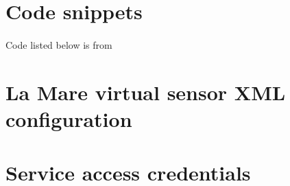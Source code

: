 \begin{appendices}
    \section{Code snippets}
    \label{appendix:fcode}
    \paragraph{}Code listed below is from \cite{pal}
    
    \clearpage
    \section{La Mare virtual sensor XML configuration}
    \label{appendix:vsensor}
    
    \clearpage
	\section{Service access credentials}
	\label{appendix:cred}
	
	\clearpage
\end{appendices}
